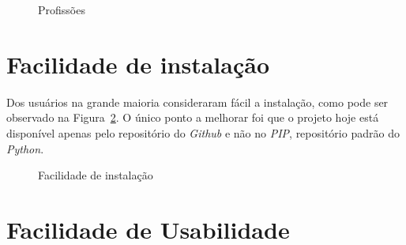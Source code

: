         \begin{figure}[H]
            \vspace*{0,2cm}
            \centering
            \caption{Profissões}
            \label{fig:profissao}
        \end{figure}

    \section{Facilidade de instalação}
        Dos usuários na grande maioria consideraram fácil a instalação, como pode ser observado na Figura~\ref{fig:instalacao}. O único ponto a melhorar foi
        que o projeto hoje está disponível apenas pelo repositório do \textit{Github} e não no \textit{PIP}, repositório padrão do \textit{Python}.

        \begin{figure}[H]
            \vspace*{0,2cm}
            \centering
            \caption{Facilidade de instalação}
            \label{fig:instalacao}
        \end{figure}

    \section{Facilidade de Usabilidade}

